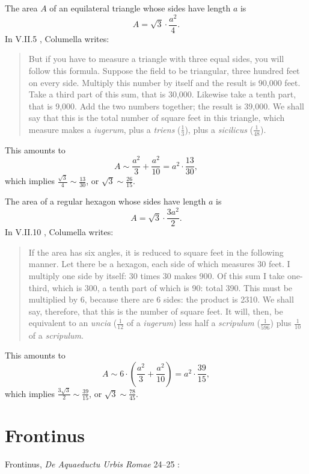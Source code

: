 \documentclass{article}
\theoremstyle{definition}
\begin{document}
The area $A$ of an equilateral triangle whose sides have length $a$ is
\[
A=\sqrt{3} \cdot \frac{a^2}{4}.
\]
In V.II.5 \cite[pp.~15--17]{columellaII}, Columella writes:

\begin{quote}
But if you have to measure a triangle with three equal sides, you will follow this formula. Suppose the field to be triangular, three hundred feet on every side. Multiply this number by itself and the result is 90,000 feet. Take a third part of this sum, that is
30,000. Likewise take a tenth part, that is 9,000. Add the two numbers together; the result is 39,000. We shall say that this is the total number of square feet in this triangle, which measure makes a {\em iugerum}, plus a {\em triens} ($\frac{1}{3}$), plus a {\em sicilicus} ($\frac{1}{48}$).
\end{quote}

This amounts to 
\[
A \sim \frac{a^2}{3}+\frac{a^2}{10} = a^2 \cdot \frac{13}{30},
\]
which implies $\frac{\sqrt{3}}{4} \sim \frac{13}{30}$, or $\sqrt{3} \sim \frac{26}{15}$. 

The area of a regular hexagon whose sides have length $a$ is
\[
A = \sqrt{3} \cdot \frac{3a^2}{2}.
\]
In V.II.10 \cite[pp.~21--23]{columellaII}, Columella writes:

\begin{quote}
If the area has six angles, it is reduced to square  feet in the following manner. Let there be a hexagon, each side of which measures 30 feet. I multiply one side by itself:
30 times 30 makes 900. Of this sum I take one-third, which is 300, a tenth part of which is 90: total 390. This must be multiplied
by 6, because there are 6 sides: the product is 2310. We shall say, therefore, that this is the number of square feet. It will, then, be equivalent to an {\em uncia}
($\frac{1}{12}$ of a {\em iugerum}) less half a {\em scripulum} ($\frac{1}{596}$) plus $\frac{1}{10}$ of a {\em scripulum}.
\end{quote}

This amounts to
\[
A \sim 6 \cdot \left( \frac{a^2}{3}+\frac{a^2}{10} \right) = a^2 \cdot \frac{39}{15},
\]
which implies $\frac{3\sqrt{3}}{2} \sim  \frac{39}{15}$, or $\sqrt{3} \sim \frac{78}{45}$. 






\section{Frontinus}
Frontinus, {\em De Aquaeductu Urbis Romae} 24--25 \cite{rodgers}:
\end{document}
